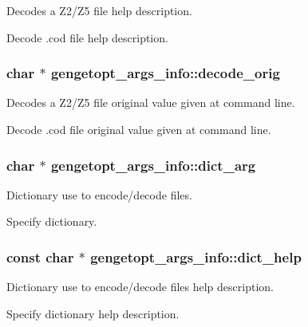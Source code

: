 Decodes a Z2/\+Z5 file help description. 

Decode .cod file help description. \hypertarget{structgengetopt__args__info_a644ec685e6e8744ec5d1f8ba7599b689}{}
\subsubsection[{decode\+\_\+orig}]{\setlength{\rightskip}{0pt plus 5cm}char $\ast$ gengetopt\+\_\+args\+\_\+info\+::decode\+\_\+orig}\label{structgengetopt__args__info_a644ec685e6e8744ec5d1f8ba7599b689}


Decodes a Z2/\+Z5 file original value given at command line. 

Decode .cod file original value given at command line. \hypertarget{structgengetopt__args__info_aac983ce261d786f26f087a839c2ef9a0}{}
\subsubsection[{dict\+\_\+arg}]{\setlength{\rightskip}{0pt plus 5cm}char $\ast$ gengetopt\+\_\+args\+\_\+info\+::dict\+\_\+arg}\label{structgengetopt__args__info_aac983ce261d786f26f087a839c2ef9a0}


Dictionary use to encode/decode files. 

Specify dictionary. \hypertarget{structgengetopt__args__info_aadf00f1fa374c83519aa8948d73d24a2}{}
\subsubsection[{dict\+\_\+help}]{\setlength{\rightskip}{0pt plus 5cm}const char $\ast$ gengetopt\+\_\+args\+\_\+info\+::dict\+\_\+help}\label{structgengetopt__args__info_aadf00f1fa374c83519aa8948d73d24a2}


Dictionary use to encode/decode files help description. 

Specify dictionary help description. \hypertarget{structgengetopt__args__info_acca4a4510495e721e10c44306b85381a}{}

